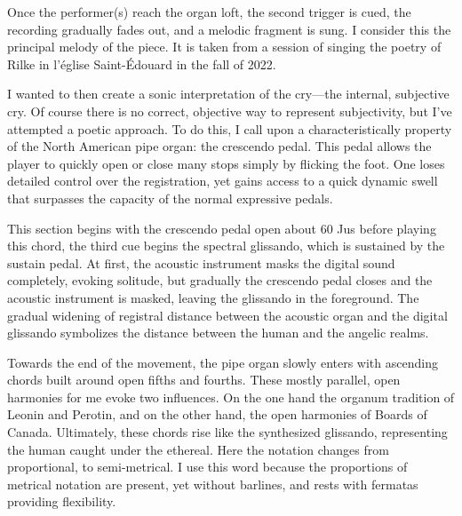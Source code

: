 \documentclass[12pt,twoside,maitrise]{dms_ks}
\theoremstyle{definition}
\begin{document}
{Once the performer(s) reach the organ loft, the second trigger is cued, the recording gradually fades out, and a melodic fragment is sung.
I consider this the principal melody of the piece.
It is taken from a session of singing the poetry of Rilke in l'église Saint-Édouard in the fall of 2022.


I wanted to then create a sonic interpretation of the cry---the internal, subjective cry.
Of course there is no correct, objective way to represent subjectivity, but I've attempted a poetic approach.
To do this, I call upon a characteristically property of the North American pipe organ: the crescendo pedal.
This pedal allows the player to quickly open or close many stops simply by flicking the foot.
One loses detailed control over the registration, yet gains access to a quick dynamic swell that surpasses the capacity of the normal expressive pedals.

This section begins with the crescendo pedal open about 60%
Jus before playing this chord, the third cue begins the spectral glissando, which is sustained by the sustain pedal.
At first, the acoustic instrument masks the digital sound completely, evoking solitude, but gradually the crescendo pedal closes and the acoustic instrument is masked, leaving the glissando in the foreground.
The gradual widening of registral distance between the acoustic organ and the digital glissando symbolizes the distance between the human and the angelic realms.


Towards the end of the movement, the pipe organ slowly enters with ascending chords built around open fifths and fourths.
These mostly parallel, open harmonies for me evoke two influences.
On the one hand the organum tradition of Leonin and Perotin, and on the other hand, the open harmonies of Boards of Canada.
Ultimately, these chords rise like the synthesized glissando, representing the human caught under the ethereal.
Here the notation changes from proportional, to semi-metrical.
I use this word because the proportions of metrical notation are present, yet without barlines, and rests with fermatas providing flexibility.

}
\end{document}
